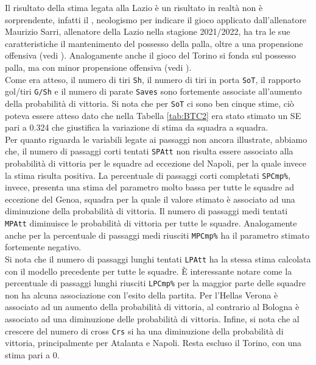 Il risultato della stima legata alla Lazio è un risultato in realtà non è sorprendente, infatti il \textit{\cite{sarrismotr}}, neologismo per indicare il gioco applicato dall'allenatore Maurizio Sarri, allenatore della Lazio nella stagione 2021/2022, ha tra le sue caratteristiche il mantenimento del possesso della palla, oltre a una propensione offensiva (vedi \textit{\cite{sarrismo}}). Analogamente anche il gioco del Torino si fonda sul possesso palla, ma con minor propensione offensiva (vedi \textit{\cite{torino}}).\\
Come era atteso, il numero di tiri \texttt{Sh}, il numero di tiri in porta \texttt{SoT}, il rapporto gol/tiri \texttt{G/Sh} e il numero di parate \texttt{Saves} sono fortemente associate all'aumento della probabilità di vittoria. Si nota che per \texttt{SoT} ci sono ben cinque stime, ciò poteva essere atteso dato che nella Tabella \ref{tab:BTC2} era stato stimato un SE pari a 0.324 che giustifica la variazione di stima da squadra a squadra. \\
Per quanto riguarda le variabili legate ai passaggi non ancora illustrate, abbiamo che, il numero di passaggi corti tentati \texttt{SPAtt} non risulta essere associato alla probabilità di vittoria per le squadre ad eccezione del Napoli, per la quale invece la stima risulta positiva. La percentuale di passaggi corti completati \texttt{SPCmp\%}, invece, presenta una stima del parametro molto bassa per tutte le squadre ad eccezione del Genoa, squadra per la quale il valore stimato è associato ad una diminuzione della probabilità di vittoria. Il numero di passaggi medi tentati \texttt{MPAtt} diminuisce le probabilità di vittoria per tutte le squadre. Analogamente anche per la percentuale di passaggi medi riusciti \texttt{MPCmp\%} ha il parametro stimato fortemente negativo.\\
Si nota che il numero di passaggi lunghi tentati \texttt{LPAtt} ha la stessa stima calcolata con il modello precedente per tutte le squadre. È interessante notare come la percentuale di passaggi lunghi riusciti \texttt{LPCmp\%} per la maggior parte delle squadre non ha alcuna associazione con l'esito della partita. Per l'Hellas Verona è associato ad un aumento della probabilità di vittoria, al contrario al Bologna è associato ad una diminuzione delle probabilità di vittoria. Infine, si nota che al crescere del numero di cross \texttt{Crs} si ha una diminuzione della probabilità di vittoria, principalmente per Atalanta e Napoli. Resta escluso il Torino, con una stima pari a 0.\\
